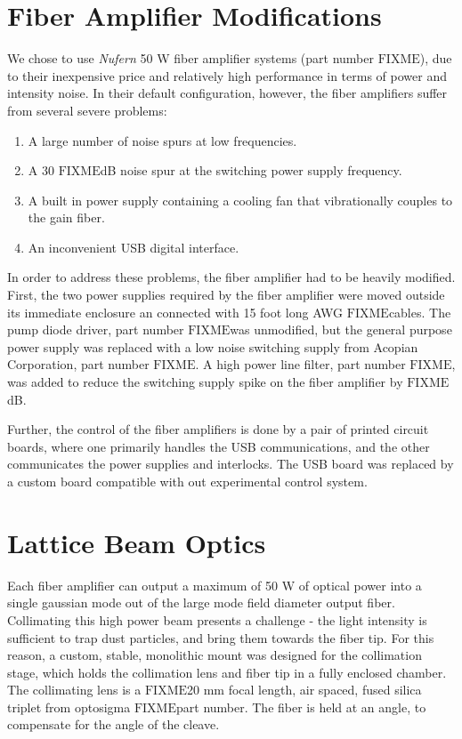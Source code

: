 \documentclass[twocolumn,aps,pra,showpacs,preprintnumbers,bibnotes]{revtex4-1}
\newcommand\FIXME{{\color{red}\ensuremath{\mathrm{FIXME}}}}
\begin{document}
\section{Fiber Amplifier Modifications}
We chose to use \textit{Nufern} 50 W fiber amplifier systems (part number \FIXME), due to their inexpensive price and relatively high performance in terms of power and intensity noise. In their default configuration, however, the fiber amplifiers suffer from several severe problems:
\begin{enumerate}
    \item A large number of noise spurs at low frequencies.
    \item A 30 \FIXME dB noise spur at the switching power supply frequency.
    \item A built in power supply containing a cooling fan that vibrationally couples to the gain fiber.
    \item An inconvenient USB digital interface.
\end{enumerate}

In order to address these problems, the fiber amplifier had to be heavily modified. First, the two power supplies required by the fiber amplifier were moved outside its immediate enclosure an connected with 15 foot long AWG \FIXME cables. The pump diode driver, part number \FIXME was unmodified, but the general purpose power supply was replaced with a low noise switching supply from Acopian Corporation, part number \FIXME. A high power line filter, part number \FIXME, was added to reduce the switching supply spike on the fiber amplifier by \FIXME dB.

Further, the control of the fiber amplifiers is done by a pair of printed circuit boards, where one primarily handles the USB communications, and the other communicates the power supplies and interlocks. The USB board was replaced by a custom board compatible with out experimental control system.

\section{Lattice Beam Optics}
Each fiber amplifier can output a maximum of 50 W of optical power into a single gaussian mode out of the large mode field diameter output fiber. Collimating this high power beam presents a challenge - the light intensity is sufficient to trap dust particles, and bring them towards the fiber tip. For this reason, a custom, stable, monolithic mount was designed for the collimation stage, which holds the collimation lens and fiber tip in a fully enclosed chamber. The collimating lens is a \FIXME 20 mm focal length, air spaced, fused silica triplet from optosigma \FIXME part number. The fiber is held at an angle, to compensate for the angle of the cleave.
\end{document}
